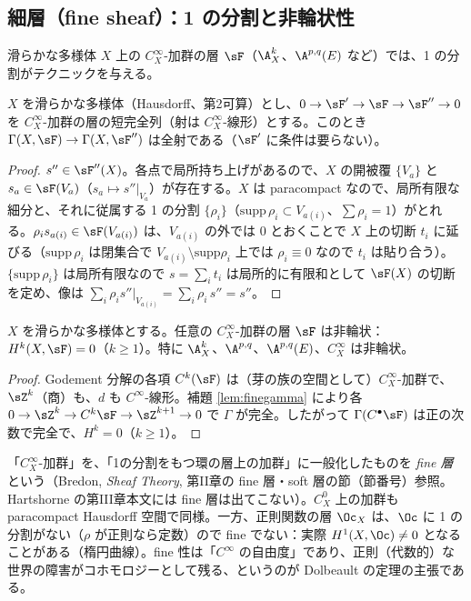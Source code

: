 \subsection{細層（fine sheaf）：1 の分割と非輪状性}
滑らかな多様体 $X$ 上の $C^\infty_X$-加群の層 $\sF$（$\A^k_X$、$\A^{p,q}(E)$ など）では、1 の分割がテクニックを与える。
\begin{lem}\label{lem:finegamma}\tP
$X$ を滑らかな多様体（Hausdorff、第2可算）とし、$0\to\sF'\to\sF\to\sF''\to0$ を $C^\infty_X$-加群の層の短完全列（射は $C^\infty_X$-線形）とする。このとき $\Gamma(X,\sF)\to\Gamma(X,\sF'')$ は全射である（$\sF'$ に条件は要らない）。
\end{lem}
\begin{proof}
$s''\in\sF''(X)$。各点で局所持ち上げがあるので、$X$ の開被覆 $\{V_a\}$ と $s_a\in\sF(V_a)$（$s_a\mapsto s''|_{V_a}$）が存在する。$X$ は paracompact なので、局所有限な細分と、それに従属する 1 の分割 $\{\rho_i\}$（$\mathrm{supp}\,\rho_i\subset V_{a(i)}$、$\sum\rho_i=1$）がとれる。$\rho_is_{a(i)}\in\sF(V_{a(i)})$ は、$V_{a(i)}$ の外では $0$ とおくことで $X$ 上の切断 $t_i$ に延びる（$\mathrm{supp}\,\rho_i$ は閉集合で $V_{a(i)}\setminus\mathrm{supp}\rho_i$ 上では $\rho_i\equiv0$ なので $t_i$ は貼り合う）。$\{\mathrm{supp}\,\rho_i\}$ は局所有限なので $s=\sum_it_i$ は局所的に有限和として $\sF(X)$ の切断を定め、像は $\sum_i\rho_is''|_{V_{a(i)}}=\sum_i\rho_i\,s''=s''$。\qedhere
\end{proof}
\begin{prop}\label{prop:fine}\tP
$X$ を滑らかな多様体とする。任意の $C^\infty_X$-加群の層 $\sF$ は非輪状：$H^k(X,\sF)=0$（$k\ge1$）。特に $\A^k_X$、$\A^{p,q}$、$\A^{p,q}(E)$、$C^\infty_X$ は非輪状。
\end{prop}
\begin{proof}
Godement 分解の各項 $C^k(\sF)$ は（芽の族の空間として）$C^\infty_X$-加群で、$\sZ^k$（商）も、$d$ も $C^\infty$-線形。補題 \ref{lem:finegamma} により各 $0\to\sZ^k\to C^k\sF\to\sZ^{k+1}\to0$ で $\Gamma$ が完全。したがって $\Gamma(C^\bullet\sF)$ は正の次数で完全で、$H^k=0$（$k\ge1$）。\qedhere
\end{proof}
\begin{rem}
「$C^\infty_X$-加群」を、「1の分割をもつ環の層上の加群」に一般化したものを \emph{fine 層}という（Bredon, \emph{Sheaf Theory}, 第II章の fine 層・soft 層の節\tQ{}（節番号）参照。Hartshorne の第III章本文には fine 層は出てこない）。$C^0_X$ 上の加群も paracompact Hausdorff 空間で同様。一方、正則関数の層 $\Oc_X$ は、$\Oc$ に 1 の分割がない（$\rho$ が正則なら定数）ので fine でない：実際 $H^1(X,\Oc)\ne0$ となることがある（楕円曲線）。fine 性は「$C^\infty$ の自由度」であり、正則（代数的）な世界の障害がコホモロジーとして残る、というのが Dolbeault の定理の主張である。
\end{rem}

